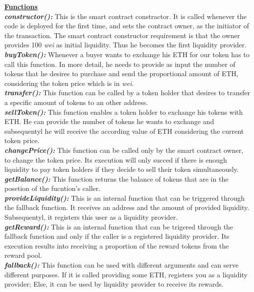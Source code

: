 \documentclass[12pt,a4paper]{article}
\begin{document}
\textbf{\underline{Functions}} \\
\textbf{\emph{constructor():}} This is the smart contract constractor. It is called
whenever the code is deployed for the first time, and sets the contract owner,
as the initiator of the transaction. The smart contract constructor requirement
is that the owner provides 100 \emph{wei} as initial liquidity. Thus he becomes
the first liquidity provider.\\
\textbf{\emph{buyToken():}} Whenever a buyer wants to exchange his ETH for our token has
to call this function. In more detail, he needs to provide as input the number
of tokens that he desires to purchase and send the proportional amount of ETH,
considering the token price which is in \emph{wei}.\\
\textbf{\emph{transfer():}} This function can be called by a token holder that desires to
transfer a specific amount of tokens to an other address.\\
\textbf{\emph{sellToken():}} This function enables a token holder to exchange his tokens
with ETH. He can provide the number of tokens he wants to exchange and
subsequentyl he will receive the according value of ETH considering the current
token price.\\
\textbf{\emph{changePrice():}} This function can be called only by the smart contract
owner, to change the token price. Its execution will only succed if there is
enough liquidity to pay token holders if they decide to sell their token
simultaneously.\\
\textbf{\emph{getBalance():}} This function returns the balance of tokens that are in the
posetion of the fucntion's caller.\\
\textbf{\emph{provideLiquidity():}} This is an internal function that can be triggered
through the fallback function. It receives an address and the amount of provided
liquidity. Subsequentyl, it registers this user as a liquidity provider. \\
\textbf{\emph{getReward():}} This is an internal function that can be trigered through
the fallback function and only if the caller is a registered liquidity provider.
Its execution results into receiving a proportion of the reward tokens from the
reward pool.\\
\textbf{\emph{fallback():}} This function can be used with different arguments and can
serve different purposes. If it is called providing some ETH, registers you as a
liquidity provider; Else, it can be used by liquidity provider to receive its
rewards.
\end{document}

